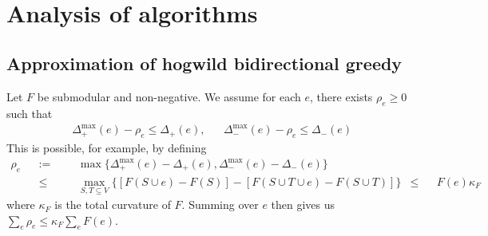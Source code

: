\documentclass{article} %
\newtheorem{cor}[thm]{Corollary}
\newtheorem{lem}[thm]{Lemma}
\begin{document}
%

~











\section{Analysis of algorithms}

\subsection{Approximation of hogwild bidirectional greedy}
Let $F$ be submodular and non-negative.
We assume for each $e$, there exists $\rho_e \geq 0$ such that
\begin{align*}
&\Delta_+^{\max}(e) - \rho_e \leq \Delta_+(e),&
&\Delta_-^{\max}(e) - \rho_e \leq \Delta_-(e)
\end{align*}
This is possible, for example, by defining
\begin{align*}
\rho_e
&&:=&&&   \max\{\Delta_+^{\max}(e) - \Delta_+(e), \Delta_-^{\max}(e) - \Delta_-(e)\}\\
&&\leq&&& \max_{S,T\subseteq V} \{[F(S\cup e) - F(S)] - [F(S \cup T \cup e) - F(S \cup T)]\}
&\leq&& F(e)\kappa_F
\end{align*}
where $\kappa_F$ is the total curvature of $F$.
Summing over $e$ then gives us $\sum_e \rho_e \leq \kappa_F\sum_e F(e)$.
\end{document}
